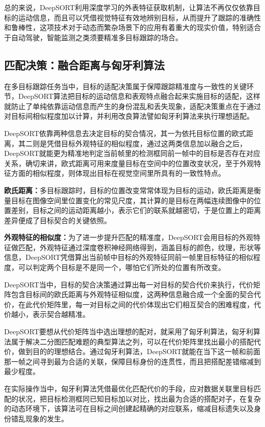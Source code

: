 总的来说，DeepSORT利用深度学习的外表特征获取机制，让算法不再仅仅依靠目标的运动信息，而且可以凭借视觉特征有效地辨别目标，从而提升了跟踪的准确性和鲁棒性，这项技术对于动态而繁杂场景下的应用有着重大的现实价值，特别适合于自动驾驶，智能监测之类须要精准多目标跟踪的场合。


\subsection{匹配决策：融合距离与匈牙利算法}

在多目标跟踪任务当中，目标的适配决策属于保障跟踪精准度与一致性的关键环节，DeepSORT算法把目标的运动信息和表观特点融合起来实施目标的适配，这样就防止了单纯依靠运动信息而产生的身份混乱和丢失现象，适配决策重点在于通过对目标间相似程度加以计算，并利用改良算法譬如匈牙利算法来执行理想适配。

DeepSORT依靠两种信息去决定目标的契合情况，其一为依托目标位置的欧式距离，其二则是凭借目标外观特征的相似程度，通过这两类信息加以融合之后，DeepSORT就能更为精准地判定当前帧里的检测框同前一帧中的目标是否存在对应关系，确切来讲，欧式距离可用来度量目标在空间中的位置改变状况，至于外观特征方面的相似程度，则体现出目标在视觉空间里所具有的一致性特点。

\textbf{欧氏距离：}多目标跟踪时，目标的位置改变常常体现为目标的运动，欧氏距离是衡量目标在图像空间里位置变化的常见尺度，其计算的是目标在两幅连续图像中的位置差别，目标之间的运动距离越小，表示它们的联系就越密切，于是位置上的距离差异便成了目标契合的关键依照。

\textbf{外观特征的相似度：}为了进一步提升匹配的精准度，DeepSORT会用目标的外观特征做匹配，外观特征通过深度卷积神经网络得到，涵盖目标的颜色，纹理，形状等信息，DeepSORT凭借算出当前帧中目标的外观特征同前一帧里目标特征的相似程度，可以判定两个目标是不是同一个，哪怕它们所处的位置有所改变。

DeepSORT当中，目标的契合决策通过算出每一对目标的契合代价来执行，代价矩阵包含目标间的欧氏距离与外观特征相似度，这两种信息融合成一个全面的契合代价，在此代价矩阵里，每一对目标之间的代价体现出它们相互契合的困难程度，代价越小，表示契合越精准。

DeepSORT要想从代价矩阵当中选出理想的配对，就采用了匈牙利算法，匈牙利算法属于解决二分图匹配难题的典型算法之列，可以在代价矩阵里找出最小的搭配代价，做到目的的理想结合。通过匈牙利算法，DeepSORT就能在当下这一帧和前面那一帧之间寻到最为合适的关联，保障目标身份的连贯性，而且把搭配差错缩减到最少程度。

在实际操作当中，匈牙利算法凭借最优化匹配代价的手段，应对数据关联里目标匹配的状况，把目标检测框同已知目标加以对比，找出最为合适的搭配对子，在复杂的动态环境下，该算法可在目标之间创建起精确的对应联系，缩减目标遗失以及身份错乱现象的发生。

